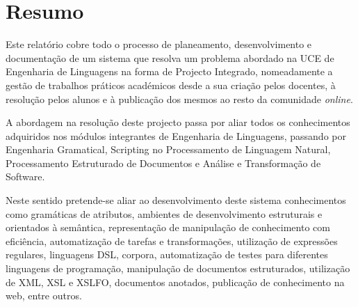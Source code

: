 \section{Resumo}
  Este relatório cobre todo o processo de planeamento, desenvolvimento e
  documentação de um sistema que resolva um problema abordado na UCE de
  Engenharia de Linguagens na forma de Projecto Integrado, nomeadamente
  a gestão de trabalhos práticos académicos desde a sua criação pelos docentes, à resolução pelos alunos
  e à publicação dos mesmos ao resto da comunidade \textit{online}.

  A abordagem na resolução deste projecto passa por aliar todos os conhecimentos
  adquiridos nos módulos integrantes de Engenharia de Linguagens, passando por
 Engenharia Gramatical, Scripting no Processamento de Linguagem Natural, Processamento
 Estruturado de Documentos e Análise e Transformação de Software.

 Neste sentido pretende-se aliar ao desenvolvimento deste sistema conhecimentos
 como gramáticas de atributos, ambientes de desenvolvimento estruturais e
 orientados à semântica, representação de manipulação de conhecimento com
 eficiência, automatização de tarefas e transformações, utilização de expressões
 regulares, linguagens DSL, corpora, automatização de testes para diferentes
 linguagens de programação, manipulação de documentos estruturados, utilização
 de XML, XSL e XSLFO, documentos anotados, publicação de conhecimento na web,
 entre outros.
